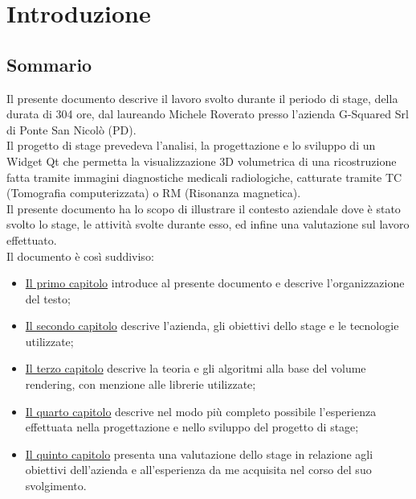 
\chapter{Introduzione}
\label{cap:introduzione}

\section{Sommario}

Il presente documento descrive il lavoro svolto durante il periodo di stage, della durata di 304 ore, dal laureando Michele Roverato presso l'azienda G-Squared Srl di Ponte San Nicolò (PD).
\\
Il progetto di stage prevedeva l'analisi, la progettazione e lo sviluppo di un Widget Qt che permetta la visualizzazione 3D volumetrica di una ricostruzione fatta tramite immagini diagnostiche medicali radiologiche, catturate tramite TC (Tomografia computerizzata) o RM (Risonanza magnetica).
\\
Il presente documento ha lo scopo di illustrare il contesto aziendale dove è stato svolto lo stage, le attività svolte durante esso, ed infine una valutazione sul lavoro effettuato.
\\
Il documento è così suddiviso:
\begin{itemize}
    \item \hyperref[cap:introduzione]{Il primo capitolo} introduce al presente documento e descrive l'organizzazione del testo;
    \item \hyperref[cap:descrizione-stage]{Il secondo capitolo} descrive l'azienda, gli obiettivi dello stage e le tecnologie utilizzate;
    \item \hyperref[cap:teoria-stage]{Il terzo capitolo} descrive la teoria e gli algoritmi alla base del volume rendering, con menzione alle librerie utilizzate;
    \item \hyperref[cap:resoconto-stage]{Il quarto capitolo} descrive nel modo più completo possibile l’esperienza effettuata nella progettazione e nello sviluppo del progetto di stage;
	\item \hyperref[cap:conclusioni]{Il quinto capitolo} presenta una valutazione dello stage in relazione agli obiettivi dell'azienda e all'esperienza da me acquisita nel corso del suo svolgimento.
\end{itemize}

